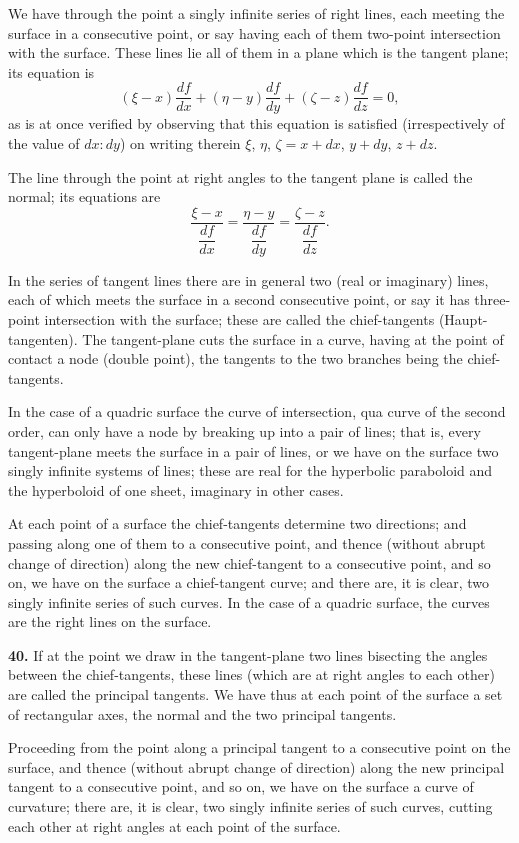 \documentclass[11pt,a4paper]{article}
\begin{document}
We have through the point a singly infinite series of right lines, each meeting the surface in a consecutive point, or say having each of them two-point intersection with the surface. These lines lie all of them in a plane which is the tangent plane; its equation is
\[
(\xi - x)\frac{df}{dx} + (\eta - y)\frac{df}{dy} + (\zeta - z)\frac{df}{dz} = 0,
\]
as is at once verified by observing that this equation is satisfied (irrespectively of the value of $dx : dy$) on writing therein $\xi$, $\eta$, $\zeta = x + dx$, $y + dy$, $z + dz$.

The line through the point at right angles to the tangent plane is called the normal; its equations are
\[
\frac{\xi - x}{\dfrac{df}{dx}} = \frac{\eta - y}{\dfrac{df}{dy}} = \frac{\zeta - z}{\dfrac{df}{dz}}.
\]

In the series of tangent lines there are in general two (real or imaginary) lines, each of which meets the surface in a second consecutive point, or say it has three-point intersection with the surface; these are called the chief-tangents (Haupt-tangenten). The tangent-plane cuts the surface in a curve, having at the point of contact a node (double point), the tangents to the two branches being the chief-tangents.

In the case of a quadric surface the curve of intersection, qua curve of the second order, can only have a node by breaking up into a pair of lines; that is, every tangent-plane meets the surface in a pair of lines, or we have on the surface two singly infinite systems of lines; these are real for the hyperbolic paraboloid and the hyperboloid of one sheet, imaginary in other cases.

At each point of a surface the chief-tangents determine two directions; and passing along one of them to a consecutive point, and thence (without abrupt change of direction) along the new chief-tangent to a consecutive point, and so on, we have on the surface a chief-tangent curve; and there are, it is clear, two singly infinite series of such curves. In the case of a quadric surface, the curves are the right lines on the surface.

\textbf{40.}\quad
If at the point we draw in the tangent-plane two lines bisecting the angles between the chief-tangents, these lines (which are at right angles to each other) are called the principal tangents. We have thus at each point of the surface a set of rectangular axes, the normal and the two principal tangents.

Proceeding from the point along a principal tangent to a consecutive point on the surface, and thence (without abrupt change of direction) along the new principal tangent to a consecutive point, and so on, we have on the surface a curve of curvature; there are, it is clear, two singly infinite series of such curves, cutting each other at right angles at each point of the surface.
\end{document}
